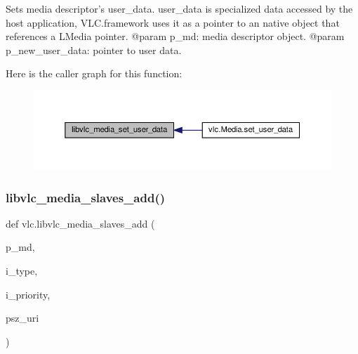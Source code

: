 \begin{DoxyVerb}Sets media descriptor's user_data. user_data is specialized data
accessed by the host application, VLC.framework uses it as a pointer to
an native object that references a L{Media} pointer.
@param p_md: media descriptor object.
@param p_new_user_data: pointer to user data.
\end{DoxyVerb}
 Here is the caller graph for this function\+:
\nopagebreak
\begin{figure}[H]
\begin{center}
\leavevmode
\includegraphics[width=350pt]{namespacevlc_affc60076c09dcc9f852525c10e09c095_icgraph}
\end{center}
\end{figure}
\mbox{\label{namespacevlc_a1982967514b4a8cb9ac19f3edbdc4702}} 
\subsubsection{\texorpdfstring{libvlc\+\_\+media\+\_\+slaves\+\_\+add()}{libvlc\_media\_slaves\_add()}}
{\footnotesize\ttfamily def vlc.\+libvlc\+\_\+media\+\_\+slaves\+\_\+add (\begin{DoxyParamCaption}\item[{}]{p\+\_\+md,  }\item[{}]{i\+\_\+type,  }\item[{}]{i\+\_\+priority,  }\item[{}]{psz\+\_\+uri }\end{DoxyParamCaption})}

